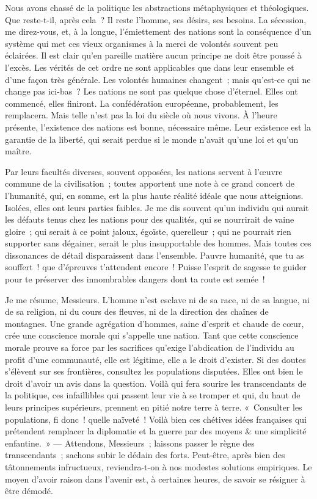 \documentclass[french,twoside]{book} %
\newcommand\chapterclose{} %
\begin{document}
Nous avons chassé de la politique les abstractions métaphysiques et théologiques. Que reste-t-il, après cela ? Il reste l’homme, ses désirs, ses besoins. La sécession, me direz-vous, et, à la longue, l’émiettement des nations sont la conséquence d’un système qui met ces vieux organismes à la merci de volontés souvent peu éclairées. Il est clair qu’en pareille matière aucun principe ne doit être poussé à l’excès. Les vérités de cet ordre ne sont applicables que dans leur ensemble et d’une façon très générale. Les volontés humaines changent ; mais qu’est-ce qui ne change pas ici-bas ? Les nations ne sont pas quelque chose d’éternel. Elles ont commencé, elles finiront. La confédération européenne, probablement, les remplacera. Mais telle n’est pas la loi du siècle où nous vivons. À l’heure présente, l’existence des nations est bonne, nécessaire même. Leur existence est la garantie de la liberté, qui serait perdue si le monde n’avait qu’une loi et qu’un maître.\par
Par leurs facultés diverses, souvent opposées, les nations servent à l’œuvre commune de la civilisation ; toutes apportent une note à ce grand concert de l’humanité, qui, en somme, est la plus haute réalité idéale que nous atteignions. Isolées, elles ont leurs parties faibles. Je me dis souvent qu’un individu qui aurait les défauts tenus chez les nations pour des qualités, qui se nourrirait de vaine gloire ; qui serait à ce point jaloux, égoïste, querelleur ; qui ne pourrait rien supporter sans dégainer, serait le plus insupportable des hommes. Mais toutes ces dissonances de détail disparaissent dans l’ensemble. Pauvre humanité, que tu as souffert ! que d’épreuves t’attendent encore ! Puisse l’esprit de sagesse te guider pour te préserver des innombrables dangers dont ta route est semée !\par
Je me résume, Messieurs. L’homme n’est esclave ni de sa race, ni de sa langue, ni de sa religion, ni du cours des fleuves, ni de la direction des chaînes de montagnes. Une grande agrégation d’hommes, saine d’esprit et chaude de cœur, crée une conscience morale qui s’appelle une nation. Tant que cette conscience morale prouve sa force par les sacrifices qu’exige l’abdication de l’individu au profit d’une communauté, elle est légitime, elle a le droit d’exister. Si des doutes s’élèvent sur ses frontières, consultez les populations disputées. Elles ont bien le droit d’avoir un avis dans la question. Voilà qui fera sourire les transcendants de la politique, ces infaillibles qui passent leur vie à se tromper et qui, du haut de leurs principes supérieurs, prennent en pitié notre terre à terre. « Consulter les populations, fi donc ! quelle naïveté ! Voilà bien ces chétives idées françaises qui prétendent remplacer la diplomatie et la guerre par des moyens \& une simplicité enfantine. » — Attendons, Messieurs ; laissons passer le règne des transcendants ; sachons subir le dédain des forts. Peut-être, après bien des tâtonnements infructueux, reviendra-t-on à nos modestes solutions empiriques. Le moyen d’avoir raison dans l’avenir est, à certaines heures, de savoir se résigner à être démodé.
\chapterclose
\end{document}
